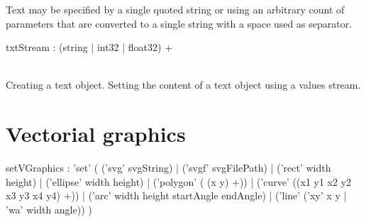 \documentclass[a4paper,twoside]{report}
\newcommand{\sublevel}[1]	{\section{#1}}
\begin{document}
Text may be specified by a single quoted string or using an arbitrary count of parameters that are converted to a single string with a space used as separator.
\begin{rail}
txtStream :  (string | int32 | float32) +
\end{rail}

\example \\
Creating a text object.
Setting the content of a text object using a values stream.


\sublevel{Vectorial graphics}
\label{vgraphscore}


\begin{rail}
setVGraphics : 'set' (
	('svg' svgString) |
	('svgf' svgFilePath) |
	('rect' width height) |
	('ellipse' width height) |
	('polygon' ( (x y) +)) |
	('curve' ((x1 y1 x2 y2 x3 y3 x4 y4) +)) |
	('arc' width height startAngle endAngle) |
	('line' ('xy' x y | 'wa' width angle))
)
\end{rail}
\end{document}
